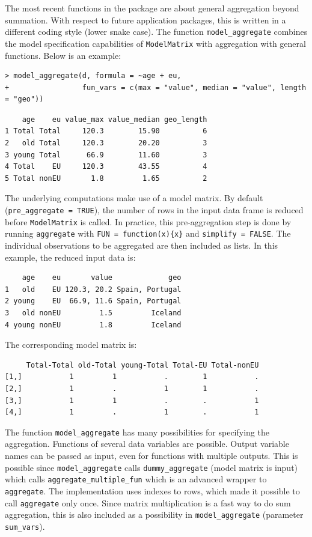 The most recent functions in the  package are about general aggregation beyond summation.
With respect to future application packages, this is written in a different coding style (lower snake case).
The function \texttt{model\_aggregate} combines the model specification capabilities of \texttt{ModelMatrix} with aggregation with general functions. Below is an example:

\begin{verbatim}
> model_aggregate(d, formula = ~age + eu, 
+                 fun_vars = c(max = "value", median = "value", length = "geo"))
\end{verbatim}

\begin{verbatim}
    age    eu value_max value_median geo_length
1 Total Total     120.3        15.90          6
2   old Total     120.3        20.20          3
3 young Total      66.9        11.60          3
4 Total    EU     120.3        43.55          4
5 Total nonEU       1.8         1.65          2
\end{verbatim}

The underlying computations make use of a model matrix. By default (\texttt{pre\_aggregate\ =\ TRUE}), the number of rows in the input data frame is reduced before \texttt{ModelMatrix} is called.
In practice, this pre-aggregation step is done by running \texttt{aggregate} with \texttt{FUN\ =\ function(x)\{x\}} and \texttt{simplify\ =\ FALSE}.
The individual observations to be aggregated are then included as lists. In this example, the reduced input data is:

\begin{verbatim}
    age    eu       value             geo
1   old    EU 120.3, 20.2 Spain, Portugal
2 young    EU  66.9, 11.6 Spain, Portugal
3   old nonEU         1.5         Iceland
4 young nonEU         1.8         Iceland
\end{verbatim}

The corresponding model matrix is:

\begin{verbatim}
     Total-Total old-Total young-Total Total-EU Total-nonEU
[1,]           1         1           .        1           .
[2,]           1         .           1        1           .
[3,]           1         1           .        .           1
[4,]           1         .           1        .           1
\end{verbatim}

The function \texttt{model\_aggregate} has many possibilities for specifying the aggregation.
Functions of several data variables are possible. Output variable names can be passed as input, even for functions with multiple outputs.
This is possible since \texttt{model\_aggregate} calls \texttt{dummy\_aggregate} (model matrix is input) which calls
\texttt{aggregate\_multiple\_fun} which is an advanced wrapper to \texttt{aggregate}.
The implementation uses indexes to rows, which made it possible to call \texttt{aggregate} only once.
Since matrix multiplication is a fast way to do sum aggregation, this is also included as a possibility in \texttt{model\_aggregate} (parameter \texttt{sum\_vars}).

